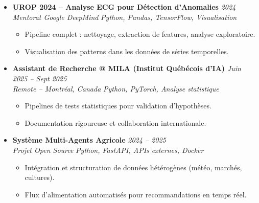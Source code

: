 \documentclass[a4paper,11pt]{article}
\begin{document}
\begin{itemize}[leftmargin=*, label={-}]
\item \textbf{UROP 2024 -- Analyse ECG pour Détection d'Anomalies} \hfill \textit{2024} \\
\textit{Mentorat Google DeepMind} \hfill \textit{Python, Pandas, TensorFlow, Visualisation}
\vspace{-2pt}
    \begin{itemize}[leftmargin=0.4cm, nosep, label=\tiny$\bullet$]
        \item \small{Pipeline complet : nettoyage, extraction de features, analyse exploratoire.}
        \item \small{Visualisation des patterns dans les données de séries temporelles.}
    \end{itemize}
\vspace{3pt}

\item \textbf{Assistant de Recherche @ MILA (Institut Québécois d'IA)} \hfill \textit{Juin 2025 -- Sept 2025} \\
\textit{Remote -- Montréal, Canada} \hfill \textit{Python, PyTorch, Analyse statistique}
\vspace{-2pt}
    \begin{itemize}[leftmargin=0.4cm, nosep, label=\tiny$\bullet$]
        \item \small{Pipelines de tests statistiques pour validation d'hypothèses.}
        \item \small{Documentation rigoureuse et collaboration internationale.}
    \end{itemize}
\vspace{3pt}

\item \textbf{Système Multi-Agents Agricole} \hfill \textit{2024 -- 2025} \\
\textit{Projet Open Source} \hfill \textit{Python, FastAPI, APIs externes, Docker}
\vspace{-2pt}
    \begin{itemize}[leftmargin=0.4cm, nosep, label=\tiny$\bullet$]
        \item \small{Intégration et structuration de données hétérogènes (météo, marchés, cultures).}
        \item \small{Flux d'alimentation automatisés pour recommandations en temps réel.}
    \end{itemize}
\vspace{3pt}

\end{itemize}
\end{document}
